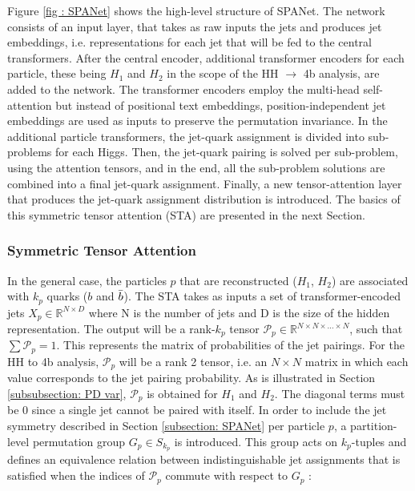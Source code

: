 Figure \ref{fig : SPANet} shows the high-level structure of SPANet. The network consists of an input layer, that takes as raw inputs the jets and produces jet embeddings, i.e. representations for each jet that will be fed to the central transformers. After the central encoder, additional transformer encoders for each particle, these being $H_1$ and $H_2$ in the scope of the HH $\to$ 4b analysis, are added to the network. The transformer encoders employ the multi-head self-attention \cite{attentiontransformer} but instead of positional text embeddings, position-independent jet embeddings are used as inputs to preserve the permutation invariance. In the additional particle transformers, the jet-quark assignment is divided into sub-problems for each Higgs. Then, the jet-quark pairing is solved per sub-problem, using the attention tensors, and in the end, all the sub-problem solutions are combined into a final jet-quark assignment. Finally, a new tensor-attention layer that produces the jet-quark assignment distribution is introduced. The basics of this symmetric tensor attention (STA) are presented in the next Section. 

\subsubsection{Symmetric Tensor Attention} \label{STA}
 In the general case, the particles $p$ that are reconstructed ($H_1$, $H_2$) are associated with $k_p$ quarks ($b$ and $\Bar{b}$). The STA takes as inputs a set of transformer-encoded jets $X_p \in \mathbb{R}^{N\times D}$ where N is the number of jets and D is the size of the hidden representation. The output will be a rank-$k_p$ tensor $\mathcal{P}_p \in \mathbb{R}^{N\times N \times ... \times N} $, such that $\sum \mathcal{P}_p=1 $. This represents the matrix of probabilities of the jet pairings. For the HH to 4b analysis, $\mathcal{P}_p$ will be a rank 2 tensor, i.e. an $N \times N$ matrix in which each value corresponds to the jet pairing probability. As is illustrated in Section \ref{subsubsection: PD var}, $\mathcal{P}_p$ is obtained for $H_1$ and $H_2$. The diagonal terms must be 0 since a single jet cannot be paired with itself. In order to include the jet symmetry described in Section \ref{subsection: SPANet} per particle $p$, a partition-level permutation group $G_p \in S_{k_p}$ is introduced. This group acts on $k_p$-tuples and defines an equivalence relation between indistinguishable jet assignments that is satisfied when the indices of $\mathcal{P}_p$ commute with respect to $G_p$ \cite{SPANet}:

